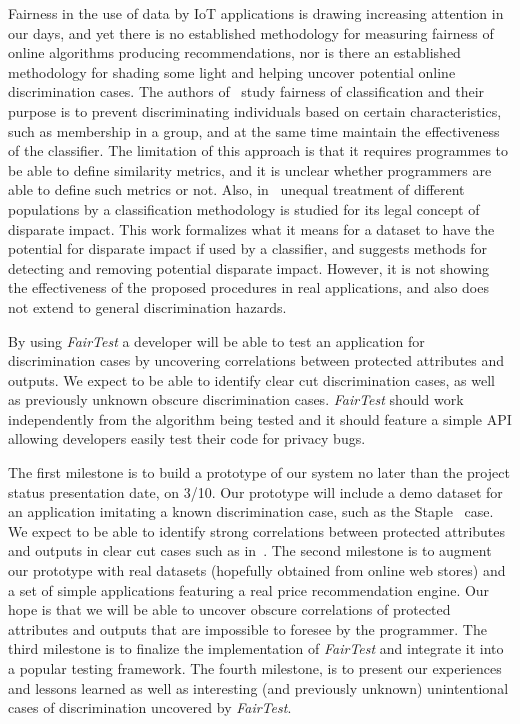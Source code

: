 \documentclass{article}
\newcommand{\thetool}{{\it FairTest}\xspace}
\newcommand{\heading}[1]{\noindent{\bf{#1}}}
\begin{document}
\heading{Related Work.}
Fairness in the use of data by IoT applications is drawing increasing
attention in our days, and yet there is no established methodology for
measuring fairness of online algorithms producing recommendations, nor is
there an established methodology for shading some light and helping
uncover potential online discrimination cases. The authors of~\cite{Fairness}
study fairness of classification and their purpose is to prevent
discriminating individuals based on certain characteristics, such as
membership in a group, and at the same time maintain the effectiveness of
the classifier. The limitation of this approach is that it requires
programmes to be able to define similarity metrics, and it is unclear
whether programmers are able to define such metrics or not. Also,
in~\cite{DisparateImpact} unequal treatment of different populations
by a classification methodology is studied for its legal concept of
disparate impact. This work formalizes what it means for a dataset to
have the potential for disparate impact if used by a classifier, and
suggests methods for detecting and removing potential disparate impact.
However, it is not showing the effectiveness of the proposed procedures
in real applications, and also does not extend to general discrimination
hazards.

\heading{Expected Conclusions.}
By using \thetool a developer will be able to test an application for
discrimination cases by uncovering correlations between protected attributes
and outputs. We expect to be able to identify clear cut discrimination cases,
as well as previously unknown obscure discrimination cases. \thetool should
work independently from the algorithm being tested and it should feature a
simple API allowing developers easily test their code for privacy bugs.

\heading{Research Plan.}
The first milestone is to build a prototype of our system no later than
the project status presentation date, on 3/10. Our prototype will include a
demo dataset for an application imitating a known discrimination case,
such as the Staple~\cite{Staples} case. We expect to be able to identify
strong correlations between protected attributes and outputs in clear cut
cases such as in~\cite{Staples}. The second milestone is to augment our
prototype with real datasets (hopefully obtained from online web stores)
and a set of simple applications featuring a real price recommendation
engine. Our hope is that we will be able to uncover obscure correlations
of protected attributes and outputs that are impossible to foresee by the
programmer. The third milestone is to finalize the implementation of \thetool
and integrate it into a popular testing framework. The fourth milestone,
is to present our experiences and lessons learned as well as interesting
(and previously unknown) unintentional cases of discrimination
uncovered by \thetool.

{
  \scriptsize
  \setlength\itemsep{0pt}
  \footnotesize
  
  
}
\end{document}
